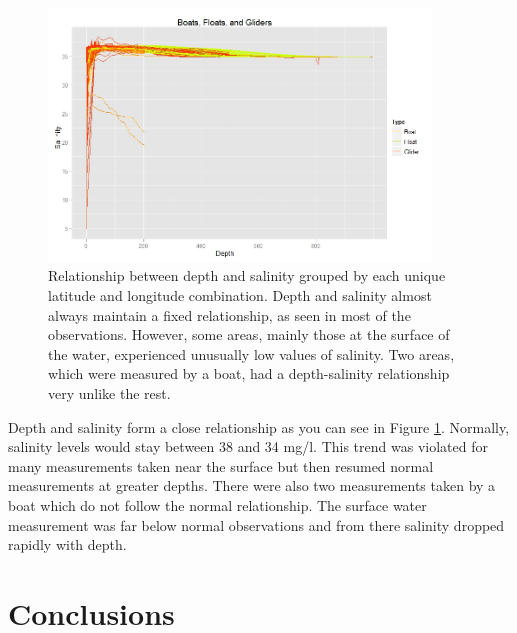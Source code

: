 \documentclass[authoryear,12pt]{elsarticle}
\begin{document}
\begin{figure}[htbp] %
   \centering
   \includegraphics[width=4in]{salinity-depth.jpeg} 
   \caption{Relationship between depth and salinity grouped by each unique latitude and longitude combination. Depth and salinity almost always maintain a fixed relationship, as seen in most of the observations. However, some areas, mainly those at the surface of the water, experienced unusually low values of salinity. Two areas, which were measured by a boat, had a depth-salinity relationship very unlike the rest.}
   \label{Depth-Salinity}
\end{figure}
Depth and salinity form a close relationship as you can see in Figure \ref {Depth-Salinity}. Normally, salinity levels would stay between 38 and 34 mg/l. This trend was violated for many measurements taken near the surface but then resumed normal measurements at greater depths. There were also two measurements taken by a boat which do not follow the normal relationship. The surface water measurement was far below normal observations and from there salinity dropped rapidly with depth. 



\section{Conclusions}
\end{document}

